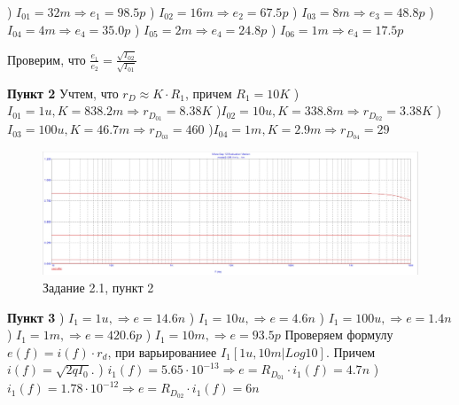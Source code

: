 \documentclass[a4paper, 14pt]{extarticle}%
\begin{document}
) $I_{01} = 32m \Rightarrow e_1 = 98.5p$
) $I_{02} = 16m \Rightarrow e_2 = 67.5p$
) $I_{03} = 8m \Rightarrow  e_3 = 48.8p$
) $I_{04} = 4m \Rightarrow e_4 = 35.0p$
) $I_{05} = 2m \Rightarrow e_4 = 24.8p$
) $I_{06} = 1m \Rightarrow e_4 = 17.5p$
\newline

Проверим, что $\frac{e_1}{e_2} = \frac{\sqrt{I_{02}}}{\sqrt{I_{01}}}$

\textbf{Пункт 2}
Учтем, что $r_D \approx K\cdot R_1$, причем $R_1 = 10K$
)$I_{01} = 1u, K = 838.2m \Rightarrow r_{D_{01}} = 8.38K$
)$I_{02} = 10u, K = 338.8m \Rightarrow r_{D_{02}} = 3.38K$
)$I_{03} = 100u, K = 46.7m  \Rightarrow r_{D_{03}} = 460$
)$I_{04} = 1m, K = 2.9m \Rightarrow r_{D_{04}} = 29$
\newline

\begin{figure}[h!]
			\centering
			\includegraphics[width=1.1\linewidth]{2.1/pic13.jpg}
			\caption{Задание 2.1, пункт 2}
			\label{A}
\end{figure}


\textbf{Пункт 3}
) $I_1 = 1u, \Rightarrow e = 14.6n$
) $I_1 = 10u, \Rightarrow e = 4.6n $
) $I_1 = 100u , \Rightarrow  e = 1.4n $
) $I_1 = 1m , \Rightarrow e = 420.6p$
) $I_1 = 10m,  \Rightarrow e = 93.5p$
\newline
Проверяем формулу $e(f) = i(f)\cdot r_d$, при варьированиее $I_1[1u, 10m | Log10] $.
\newline
Причем $i(f) = \sqrt{2qI_0}$.
) $i_1(f) = 5.65\cdot 10^{-13} \Rightarrow e = R_{D_{01}} \cdot i_1(f)  = 4.7n$
) $i_1(f) = 1.78\cdot 10^{-12} \Rightarrow e = R_{D_{02}} \cdot i_1(f) = 6n$
\end{document}

